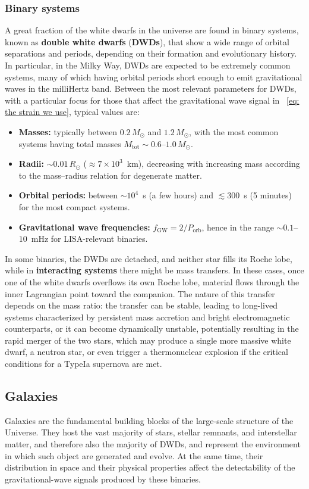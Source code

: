 \subsubsection{Binary systems}
A great fraction of the white dwarfs in the universe are found in binary systems, known as \textbf{double white dwarfs} (\textbf{DWDs}), that show a wide range of orbital separations and periods, depending on their formation and evolutionary history.  
In particular, in the Milky Way, DWDs are expected to be extremely common systems, many of which having orbital periods short enough to emit gravitational waves in the milliHertz band.  
Between the most relevant parameters for DWDs, with a particular focus for those that affect the gravitational wave signal in ~\eqref{eq: the strain we use}, typical values are:
\begin{itemize}
    \item \textbf{Masses:} typically between $0.2\,M_\odot$ and $1.2\,M_\odot$, with the most common systems having total masses $M_{\mathrm{tot}} \sim 0.6$--$1.0\,M_\odot$.
    \item \textbf{Radii:} $\sim 0.01\,R_\odot$ ($\approx 7\times 10^{3}$~km), decreasing with increasing mass according to the mass–radius relation for degenerate matter.
    \item \textbf{Orbital periods:} between $\sim 10^{4}$~s (a few hours) and $\lesssim 300$~s (5 minutes) for the most compact systems.
    \item \textbf{Gravitational wave frequencies:} $f_{\mathrm{GW}} = 2/P_{\mathrm{orb}}$, hence in the range $\sim 0.1$--$10$~mHz for LISA-relevant binaries.
\end{itemize}
In some binaries, the DWDs are detached, and neither star fills its Roche lobe, while in \textbf{interacting systems} there might be mass transfers.
In these cases, once one of the white dwarfs overflows its own Roche lobe, material flows through the inner Lagrangian point toward the companion.
The nature of this transfer depends on the mass ratio: the transfer can be stable, leading to long-lived systems characterized by persistent mass accretion and bright electromagnetic counterparts, or it can become dynamically unstable, potentially resulting in the rapid merger of the two stars, which may produce a single more massive white dwarf, a neutron star, or even trigger a thermonuclear explosion if the critical conditions for a TypeIa supernova are met.


\subsection{Galaxies}
Galaxies are the fundamental building blocks of the large-scale structure of the Universe. 
They host the vast majority of stars, stellar remnants, and interstellar matter, and therefore also the majority of DWDs, and represent the environment in which such object are generated and evolve.  
At the same time, their distribution in space and their physical properties affect the detectability of the gravitational-wave signals produced by these binaries.  


